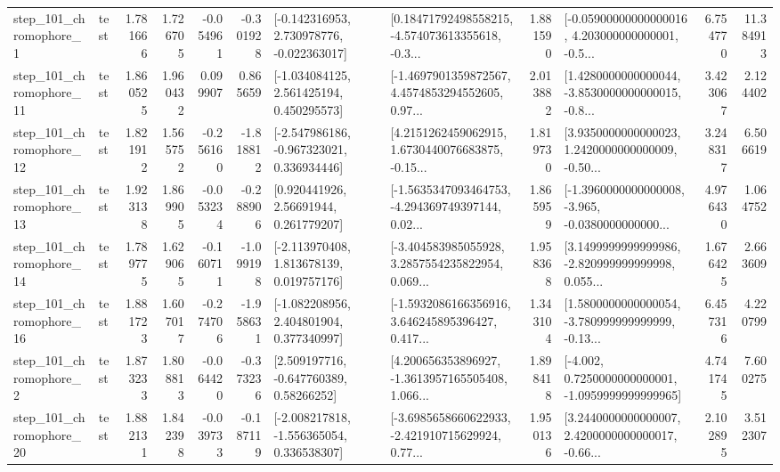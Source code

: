 \begin{tabular}{llrrrrllrlrr}
   step\_101\_chromophore\_1 &      test &      1.781666 &    1.726705 &     -0.054961 & -0.301928 &   [-0.142316953, 2.730978776, -0.022363017] &  [0.18471792498558215, -4.574073613355618, -0.3... &       1.881590 &  [-0.05900000000000016, 4.203000000000001, -0.5... &            6.754770 &         11.384913 \\
  step\_101\_chromophore\_11 &      test &      1.860525 &    1.960432 &      0.099907 &  0.865659 &    [-1.034084125, 2.561425194, 0.450295573] &  [-1.4697901359872567, 4.4574853294552605, 0.97... &       2.013882 &  [1.4280000000000044, -3.8530000000000015, -0.8... &            3.423067 &          2.124402 \\
  step\_101\_chromophore\_12 &      test &      1.821912 &    1.565752 &     -0.256160 & -1.818812 &   [-2.547986186, -0.967323021, 0.336934446] &  [4.2151262459062915, 1.6730440076683875, -0.15... &       1.819730 &  [3.9350000000000023, 1.2420000000000009, -0.50... &            3.248317 &          6.506619 \\
  step\_101\_chromophore\_13 &      test &      1.923138 &    1.869905 &     -0.053234 & -0.288906 &      [0.920441926, 2.56691944, 0.261779207] &  [-1.5635347093464753, -4.294369749397144, 0.02... &       1.865959 &  [-1.3960000000000008, -3.965, -0.0380000000000... &            4.976430 &          1.064752 \\
  step\_101\_chromophore\_14 &      test &      1.789775 &    1.629065 &     -0.160711 & -1.099198 &    [-2.113970408, 1.813678139, 0.019757176] &  [-3.404583985055928, 3.2857554235822954, 0.069... &       1.958368 &  [3.1499999999999986, -2.820999999999998, 0.055... &            1.676425 &          2.663609 \\
  step\_101\_chromophore\_16 &      test &      1.881723 &    1.607017 &     -0.274706 & -1.958631 &    [-1.082208956, 2.404801904, 0.377340997] &  [-1.5932086166356916, 3.646245895396427, 0.417... &       1.343104 &  [1.5800000000000054, -3.780999999999999, -0.13... &            6.457316 &          4.220799 \\
   step\_101\_chromophore\_2 &      test &      1.873233 &    1.808813 &     -0.064420 & -0.373236 &     [2.509197716, -0.647760389, 0.58266252] &  [4.200656353896927, -1.3613957165505408, 1.066... &       1.898418 &  [-4.002, 0.7250000000000001, -1.0959999999999965] &            4.741745 &          7.600275 \\
  step\_101\_chromophore\_20 &      test &      1.882131 &    1.842398 &     -0.039733 & -0.187119 &   [-2.008217818, -1.556365054, 0.336538307] &  [-3.6985658660622933, -2.421910715629924, 0.77... &       1.950136 &  [3.2440000000000007, 2.4200000000000017, -0.66... &            2.102895 &          3.512307 \\

\end{tabular}
